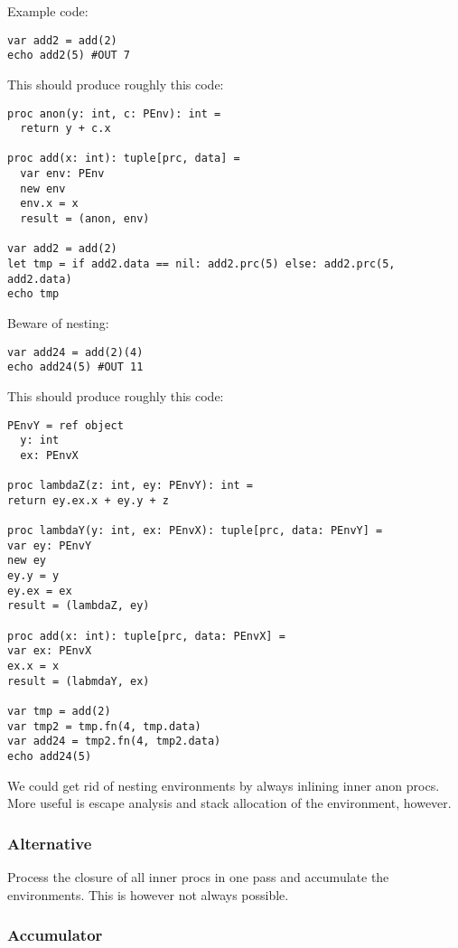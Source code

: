 Example code:

\begin{verbatim}
var add2 = add(2)
echo add2(5) #OUT 7
\end{verbatim}

This should produce roughly this code:

\begin{verbatim}
proc anon(y: int, c: PEnv): int =
  return y + c.x

proc add(x: int): tuple[prc, data] =
  var env: PEnv
  new env
  env.x = x
  result = (anon, env)

var add2 = add(2)
let tmp = if add2.data == nil: add2.prc(5) else: add2.prc(5, add2.data)
echo tmp
\end{verbatim}

Beware of nesting:

\begin{verbatim}
var add24 = add(2)(4)
echo add24(5) #OUT 11
\end{verbatim}

This should produce roughly this code:

\begin{verbatim}
PEnvY = ref object
  y: int
  ex: PEnvX

proc lambdaZ(z: int, ey: PEnvY): int =
return ey.ex.x + ey.y + z

proc lambdaY(y: int, ex: PEnvX): tuple[prc, data: PEnvY] =
var ey: PEnvY
new ey
ey.y = y
ey.ex = ex
result = (lambdaZ, ey)

proc add(x: int): tuple[prc, data: PEnvX] =
var ex: PEnvX
ex.x = x
result = (labmdaY, ex)

var tmp = add(2)
var tmp2 = tmp.fn(4, tmp.data)
var add24 = tmp2.fn(4, tmp2.data)
echo add24(5)
\end{verbatim}

We could get rid of nesting environments by always inlining inner anon
procs. More useful is escape analysis and stack allocation of the
environment, however.

\hypertarget{alternative}{%
\subsubsection{Alternative}\label{alternative}}

Process the closure of all inner procs in one pass and accumulate the
environments. This is however not always possible.

\hypertarget{accumulator}{%
\subsubsection{Accumulator}\label{accumulator}}

